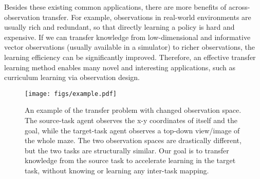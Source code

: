 Besides these existing common applications, there are more benefits of across-observation transfer. For example, observations in real-world environments are usually rich and redundant, so that directly learning a policy is hard and expensive. If we can transfer knowledge from low-dimensional and informative vector observations (usually available in a simulator) to richer observations, the learning efficiency can be significantly improved. Therefore, an effective transfer learning method enables many novel and interesting applications, such as curriculum learning via observation design.

\begin{figure}[!htbp]
\centering
    \texttt{[image: figs/example.pdf]}
\vspace{-2em}
\caption{\small{An example of the transfer problem with changed observation space.
The source-task agent observes the x-y coordinates of itself and the goal, while the target-task agent observes a top-down view/image of the whole maze. The two observation spaces are drastically different, but the two tasks are structurally similar. Our goal is to transfer knowledge from the source task to accelerate learning in the target task, without knowing or learning any inter-task mapping.%
}}
\label{fig:example}
\vspace{-1em}
\end{figure}

